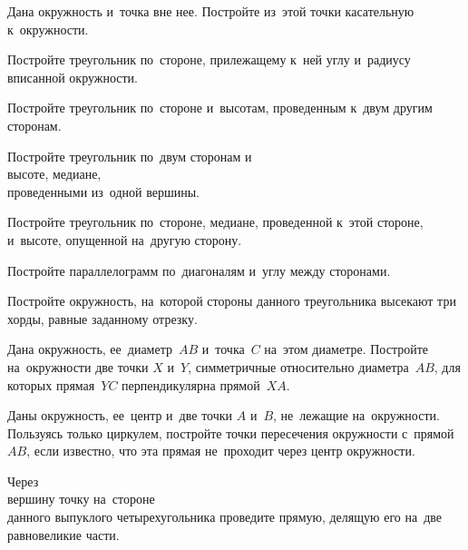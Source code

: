 \begin{problems}

\item
Дана окружность и~точка вне нее.
Постройте из~этой точки касательную к~окружности.


\item
Постройте треугольник по~стороне, прилежащему к~ней углу и~радиусу вписанной
окружности.

\item
Постройте треугольник по~стороне и~высотам, проведенным к~двум другим сторонам.

\item
Постройте треугольник по~двум сторонам и
\\
\sp высоте,
\quad
\sp медиане,
\\
проведенными из~одной вершины.


\item
Постройте треугольник по~стороне, медиане, проведенной к~этой стороне,
и~высоте, опущенной на~другую сторону.

\item
Постройте параллелограмм по~диагоналям и~углу между сторонами.


\item
Постройте окружность, на~которой стороны данного треугольника высекают три
хорды, равные заданному отрезку.

\item
Дана окружность, ее~диаметр~$AB$ и~точка~$C$ на~этом диаметре.
Постройте на~окружности две точки $X$ и~$Y$, симметричные относительно
диаметра~$AB$, для которых прямая~$YC$ перпендикулярна прямой~$XA$.

\item
Даны окружность, ее~центр и~две точки $A$ и~$B$, не~лежащие на~окружности.
Пользуясь только циркулем, постройте точки пересечения окружности
с~прямой~$AB$, если известно, что эта прямая не~проходит через центр
окружности.

\item
Через
\\
\sp вершину
\quad
\sp точку на~стороне
\\
данного выпуклого четырехугольника проведите прямую, делящую его на~две
равновеликие части.

\end{problems}

